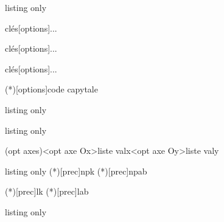 \documentclass[a4paper,french,11pt]{article}
\begin{document}
\pagebreak

\begin{PresCodeTexPL}{listing only}
\begin{TerminalWin}[largeur]{clés}[options]...\end{TerminalWin}
\begin{TerminalUnix}[largeur]{clés}[options]...\end{TerminalUnix}
\begin{TerminalOSX}[largeur]{clés}[options]...\end{TerminalOSX}

\CartoucheCapytale(*)[options]{code capytale}
\end{PresCodeTexPL}

\begin{PresCodeTexPL}{listing only}
\PaveTikz[options]
\TetraedreTikz[options]

\CercleTrigo[clés]
\end{PresCodeTexPL}

\begin{PresCodeTexPL}{listing only}

\AxesTikz[options]
 
\FenetreTikz \OrigineTikz
\FenetreSimpleTikz[options](opt axes)<opt axe Ox>{liste valx}<opt axe Oy>{liste valy}
\PointMoyenTikz[options]

\BoiteMoustaches[options]
\BoiteMoustachesAxe[options]
\end{PresCodeTexPL}

\begin{PresCodeTexPL}{listing only}
\BinomP(*)[prec]{n}{p}{k}
\BinomC(*)[prec]{n}{p}{a}{b}

\PoissonP(*)[prec]{l}{k}
\PoissonC(*)[prec]{l}{a}{b}
\end{PresCodeTexPL}

\begin{PresCodeTexPL}{listing only}

\end{PresCodeTexPL}
\end{document}
